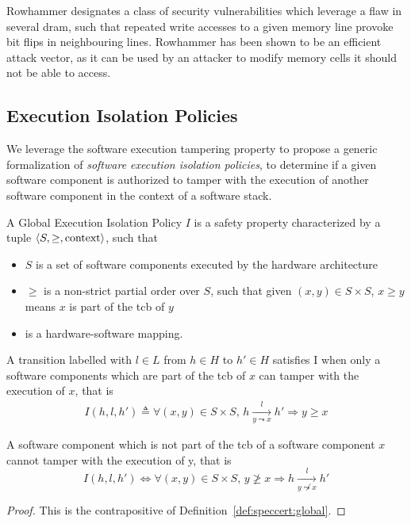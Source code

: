\begin{example}[Rowhammer]
  Rowhammer designates a class of security vulnerabilities which leverage a flaw
  in several \ac{dram}, such that repeated write accesses to a given memory line
  provoke bit flips in neighbouring lines.
  Rowhammer has been shown to be an efficient attack vector, as it can be used
  by an attacker to modify memory cells it should not be able to access.
\end{example}

\subsection{Execution Isolation Policies}
\label{subsec:speccert:globalsec}

We leverage the software execution tampering property to propose a generic
formalization of \emph{software execution isolation policies}, to determine if a
given software component is authorized to tamper with the execution of another
software component in the context of a software stack.

\begin{definition}
  \label{def:speccert:global}
  A Global Execution Isolation Policy $I$ is a safety property characterized by
  a tuple $\langle S, \ge, \mathrm{context} \rangle$, such that
  \begin{itemize}
  \item $S$ is a set of software components executed by the hardware
    architecture
  \item $\ge$ is a non-strict partial order over $S$, such that given
    $(x, y) \in S \times S$, $x \ge y$ means $x$ is part of the \ac{tcb} of $y$
  \item {} is a hardware-software mapping.
  \end{itemize}

  A transition labelled with $l \in L$ from $h \in H$ to $h' \in H$ satisfies I
  when only a software components which are part of the \ac{tcb} of $x$ can
  tamper with the execution of $x$, that is
  \[
    \begin{array}{l}
      I(h, l, h') \triangleq
      \forall (x, y) \in S \times S \text{, } h \xrightarrow[y
      \leadsto x]{l} h' \Rightarrow y \ge x
    \end{array}
  \]
\end{definition}

\begin{corollary}
  A software component which is not part of the \ac{tcb} of a software component
  $x$ cannot tamper with the execution of y, that is
  \[
    I(h, l, h') \iff \forall (x, y) \in S \times S \text{, } y \not\ge x
    \Rightarrow h \xrightarrow[y \not\leadsto x]{l} h'
  \]

  \begin{proof}
    This is the contrapositive of Definition~\ref{def:speccert:global}.
  \end{proof}
\end{corollary}

